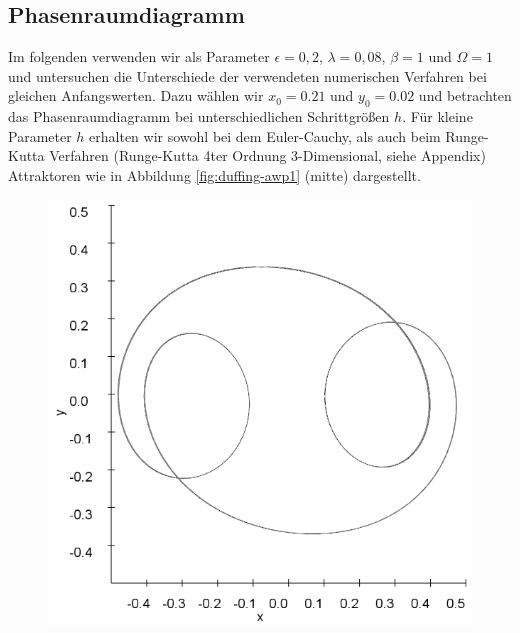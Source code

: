 \documentclass[12pt,a4paper]{article}
\begin{document}
\subsection { Phasenraumdiagramm }
Im folgenden verwenden wir als Parameter $\epsilon = 0,2$, $\lambda = 0,08$, $\beta = 1$ und $\Omega = 1$ und untersuchen die Unterschiede der verwendeten numerischen Verfahren bei gleichen Anfangswerten. Dazu wählen wir $x_0=0.21$ und $y_0=0.02$ und betrachten das Phasenraumdiagramm bei unterschiedlichen Schrittgrößen $h$. Für kleine Parameter $h$ erhalten wir sowohl bei dem Euler-Cauchy, als auch beim Runge-Kutta Verfahren (Runge-Kutta 4ter Ordnung 3-Dimensional, siehe Appendix) Attraktoren wie in Abbildung \ref{fig:duffing-awp1} (mitte) dargestellt. 
\begin{figure}[!htbp]
\includegraphics[scale=0.28]{duffing-awp1-500k-nach-500k-h0,1-euler}

\end{figure}
\end{document}
